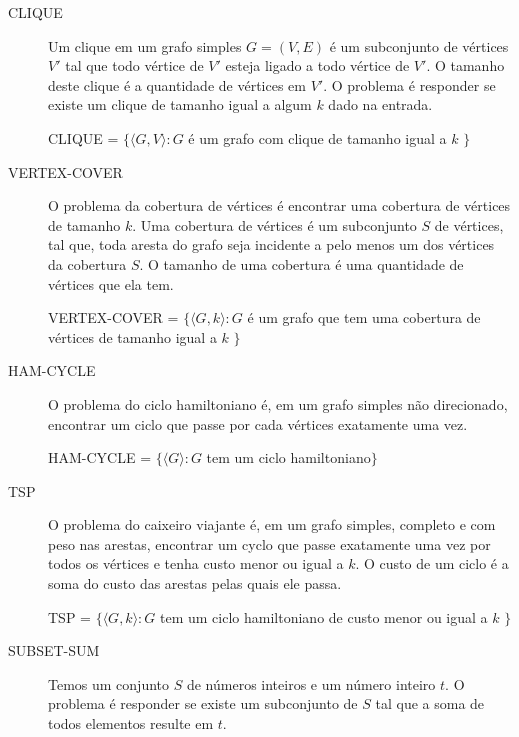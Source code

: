\documentclass[12pt]{article}
\begin{document}
\begin{description}


\item[CLIQUE]

Um clique em um grafo simples $G=(V,E)$ é um subconjunto de vértices $V'$ tal que todo vértice de $V'$ esteja ligado a todo vértice de $V'$. O tamanho deste clique é a quantidade de vértices em $V'$.
O problema é responder se existe um clique de tamanho igual a algum $k$ dado na entrada.

CLIQUE = $\{\langle G,V\rangle : G$ é um grafo com clique de tamanho igual a $k$ $\}$

\item[VERTEX-COVER]

O problema da cobertura de vértices é encontrar uma cobertura de vértices de tamanho $k$. 
Uma cobertura de vértices é um subconjunto $S$ de vértices, tal que, toda aresta do grafo seja incidente a pelo menos um dos vértices da cobertura $S$.
O tamanho de uma cobertura é uma quantidade de vértices que ela tem.

VERTEX-COVER = $\{\langle G,k\rangle : G$ é um grafo que tem uma cobertura de vértices de tamanho igual a $k$ $\}$

\item[HAM-CYCLE]

O problema do ciclo hamiltoniano é, em um grafo simples não direcionado, encontrar um ciclo que passe por cada vértices exatamente uma vez.

HAM-CYCLE = $\{\langle G\rangle : G$ tem um ciclo hamiltoniano$\}$


\item[TSP]

O problema do caixeiro viajante é, em um grafo simples, completo e com peso nas arestas, encontrar um cyclo que passe exatamente uma vez por todos os vértices e tenha custo menor ou igual a $k$.
O custo de um ciclo é a soma do custo das arestas pelas quais ele passa.

TSP = $\{\langle G, k\rangle : G$ tem um ciclo hamiltoniano de custo menor ou igual a $k$ $\}$

\item[SUBSET-SUM]

Temos um conjunto $S$ de números inteiros e um número inteiro $t$. O problema é responder se existe um subconjunto de $S$ tal que a soma de todos elementos resulte em $t$.


\end{description}
\end{document}
